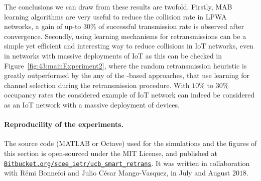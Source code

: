 The conclusions we can draw from these results are twofold.
Firstly, MAB learning algorithms are very useful to reduce the collision rate in LPWA networks, a gain of up-to $30\%$ of successful transmission rate is observed after convergence.
Secondly, using learning mechanisms for retransmissions can be a simple yet efficient and interesting way to reduce collisions in IoT networks, even in networks with massive deployments of IoT as this can be checked in Figure~\ref{fig:43:mainExperiment2}, where the random retransmission heuristic is greatly outperformed by the any of the \UCB-based approaches, that use learning for channel selection during the retransmission procedure.
With $10\%$ to $30\%$ occupancy rates the considered example of IoT network can indeed be considered as an IoT network with a massive deployment of devices.


\paragraph{Reproducility of the experiments.}
%
The source code (MATLAB or Octave) used for the simulations and the figures of this section is open-sourced under the MIT License, and published at \href{https://Bitbucket.org/scee_ietr/ucb_smart_retrans}{\texttt{Bitbucket.org/scee\_ietr/ucb\_smart\_retrans}}.
It was written in collaboration with Rémi Bonnefoi and Julio César Mango-Vasquez, in July and August $2018$.
